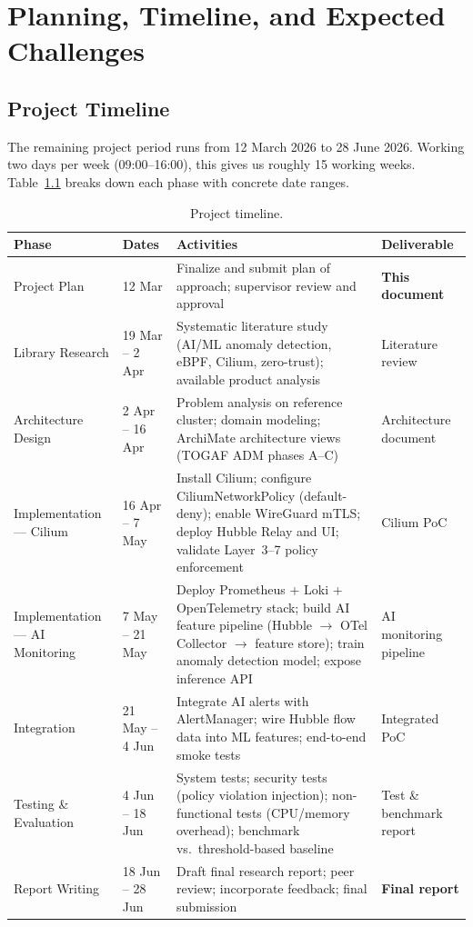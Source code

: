 \chapter{Planning, Timeline, and Expected Challenges}
\label{chapter:planning}

\section{Project Timeline}

The remaining project period runs from 12 March 2026 to 28 June 2026. Working two days per week (09:00--16:00), this gives us roughly 15 working weeks. Table~\ref{tab:timeline} breaks down each phase with concrete date ranges.

\begin{table}[H]
\centering
\caption{Project timeline.}
\label{tab:timeline}
\begin{tabular}{@{}p{3.8cm}p{3.2cm}p{4.8cm}p{2.5cm}@{}}
\toprule
\textbf{Phase} & \textbf{Dates} & \textbf{Activities} & \textbf{Deliverable} \\
\midrule
Project Plan
    & 12 Mar
    & Finalize and submit plan of approach; supervisor review and approval
    & \textbf{This document} \\
\midrule
Library Research
    & 19 Mar -- 2 Apr
    & Systematic literature study (AI/ML anomaly detection, eBPF, Cilium, zero-trust); available product analysis
    & Literature review \\
\midrule
Architecture Design
    & 2 Apr -- 16 Apr
    & Problem analysis on reference cluster; domain modeling; ArchiMate architecture views (TOGAF ADM phases A--C)
    & Architecture document \\
\midrule
Implementation --- Cilium
    & 16 Apr -- 7 May
    & Install Cilium; configure CiliumNetworkPolicy (default-deny); enable WireGuard mTLS; deploy Hubble Relay and UI; validate Layer~3--7 policy enforcement
    & Cilium PoC \\
\midrule
Implementation --- AI Monitoring
    & 7 May -- 21 May
    & Deploy Prometheus + Loki + OpenTelemetry stack; build AI feature pipeline (Hubble $\rightarrow$ OTel Collector $\rightarrow$ feature store); train anomaly detection model; expose inference API
    & AI monitoring pipeline \\
\midrule
Integration
    & 21 May -- 4 Jun
    & Integrate AI alerts with AlertManager; wire Hubble flow data into ML features; end-to-end smoke tests
    & Integrated PoC \\
\midrule
Testing \& Evaluation
    & 4 Jun -- 18 Jun
    & System tests; security tests (policy violation injection); non-functional tests (CPU/memory overhead); benchmark vs.\ threshold-based baseline
    & Test \& benchmark report \\
\midrule
Report Writing
    & 18 Jun -- 28 Jun
    & Draft final research report; peer review; incorporate feedback; final submission
    & \textbf{Final report} \\
\bottomrule
\end{tabular}
\end{table}

